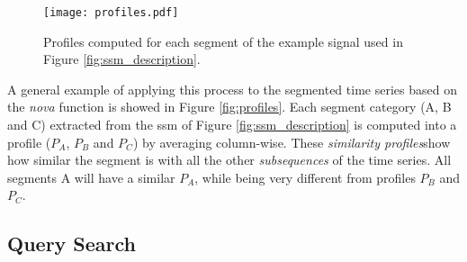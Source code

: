 \begin{figure}
\centering
\texttt{[image: profiles.pdf]}
\caption{Profiles computed for each segment of the example signal used in Figure \ref{fig:ssm_description}.}
\end{figure}

A general example of applying this process to the segmented time series based on the \textit{nova} function is showed in Figure \ref{fig:profiles}. Each segment category (A, B and C) extracted from the \gls{ssm} of Figure \ref{fig:ssm_description} is computed into a profile ($P_A$, $P_B$ and $P_C$) by averaging column-wise. These \textit{similarity profiles}show how similar the segment is with all the other \textit{subsequences} of the time series. All segments A will have a similar $P_A$, while being very different from profiles $P_B$ and $P_C$. 

\subsection{Query Search}

